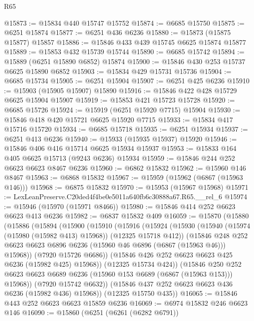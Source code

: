 \begin{lexlean}{R65}
\begin{coremodule}
{@15873 := @15834 @440 @15747 @15752
@15874 := @6685 @15750
@15875 := @6251 @15874
@15877 := @6251 @436 @6236
@15880 := @15873 (@15875 @15877) @15857
@15886 := @15846 @433 @439 @15745 @6625 @15874 @15877
@15889 := @15853 @432 @15739 @15744
@15890 := @6685 @15742
@15894 := @15889 (@6251 @15890 @6852) @15874
@15900 := @15846 @430 @253 @15737 @6625 @15890 @6852
@15903 := @15834 @429 @15731 @15736
@15904 := @6685 @15734
@15905 := @6251 @15904
@15907 := @6251 @425 @6236
@15910 := @15903 (@15905 @15907) @15890
@15916 := @15846 @422 @428 @15729 @6625 @15904 @15907
@15919 := @15853 @421 @15723 @15728
@15920 := @6685 @15726
@15924 := @15919 (@6251 @15920 @7715) @15904
@15930 := @15846 @418 @420 @15721 @6625 @15920 @7715
@15933 := @15834 @417 @15716 @15720
@15934 := @6685 @15718
@15935 := @6251 @15934
@15937 := @6251 @413 @6236
@15940 := @15933 (@15935 @15937) @15920
@15946 := @15846 @406 @416 @15714 @6625 @15934 @15937
@15953 := @15833 @164 @405 @6625 @15713 (@9243 @6236) @15934
@15959 := @15846 @244 @252 @6623 @6623 @8467 @6236
@15960 := @6862 @15832
@15962 := @15960 @146 @8467
@15963 := @6868 @15832
@15967 := @15959 (@15962 (@6867 (@15963 @146)))
@15968 := @6875 @15832
@15970 := @15953 (@15967 @15968)
@15971 := LexLeanPreserve.C20ded4f4be0e5011a640fb6c30888a67.R65.__rel_6
@15974 := @15946 (@15970 (@15971 @8466))
@15980 := @15846 @414 @252 @6623 @6623 @413 @6236
@15982 := @6837 @15832 @409
@16059 := @15870
    (@15880
      (@15886
        (@15894
          (@15900
            (@15910
              (@15916
                (@15924
                  (@15930
                    (@15940 (@15974 (@15980 (@15982 @413) @15968)) (@12325 @15718 @412))
                    (@15846
                      @248
                      @252
                      @6623
                      @6623
                      @6896
                      @6236
                      (@15960 @46 @6896 (@6867 (@15963 @46)))
                      @15968))
                  (@7920 @15726 @6686))
                (@15846 @426 @252 @6623 @6623 @425 @6236 (@15982 @425) @15968))
              (@12325 @15734 @424))
            (@15846
              @250
              @252
              @6623
              @6623
              @6689
              @6236
              (@15960 @153 @6689 (@6867 (@15963 @153)))
              @15968))
          (@7920 @15742 @6632))
        (@15846 @437 @252 @6623 @6623 @436 @6236 (@15982 @436) @15968))
      (@12325 @15750 @435))
@16065 := @15846 @443 @252 @6623 @6623 @15859 @6236
@16069 := @6974 @15832 @246 @6623 @146
@16090 := @15860
    (@6251
      (@6261 (@6282 @6791))
}
\end{coremodule}
\end{lexlean}
